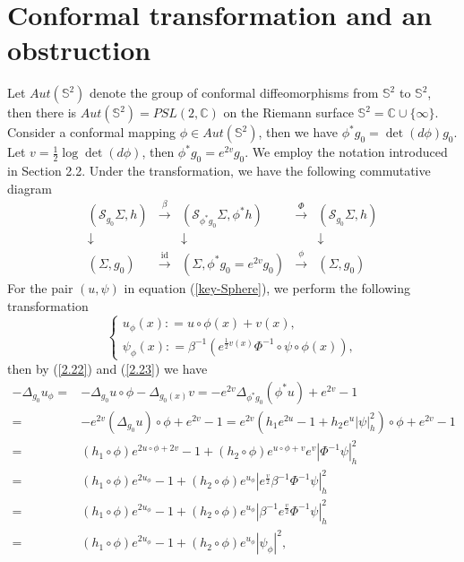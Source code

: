 \documentclass[a4paper, 12pt]{article}
\begin{document}
\section{Conformal transformation and an obstruction}
Let \(Aut(\mathbb{S}^2)\) denote the group of conformal diffeomorphisms from \( \mathbb{S}^2 \) to \( \mathbb{S}^2 \), then there is \( Aut(\mathbb{S}^2) = PSL(2,\mathbb{C}) \) on the Riemann surface $\mathbb{S}^2=\mathbb{C}\cup \{\infty\}$.  Consider a conformal mapping \( \phi \in Aut(\mathbb{S}^2) \), then we have \( {\phi ^*}{g_0} = \det (d\phi) {g_0} \). Let $v=\frac{1}{2}\log \det \left(d \phi\right) $, then \( {\phi ^*}{g_0} = e^{2v} {g_0} \). We employ the notation introduced in Section 2.2. Under the transformation, we have the following commutative diagram
\[\begin{array}{*{20}{c}}
	{({\mathcal{S}_{g_0}}\Sigma ,h)}&{\xrightarrow{\beta }}&{({\mathcal{S}_{{\phi ^*}g_0}}\Sigma ,{\phi ^*}h)}&{\xrightarrow{\Phi }}&{({\mathcal{S}_{g_0}}\Sigma ,h)} \\
	\downarrow &{}& \downarrow &{}& \downarrow  \\
	{(\Sigma ,{g_0})}&{\xrightarrow{{{\text{id}}}}}&{(\Sigma ,{\phi ^*}{g_0} = {e^{2v}}{g_0})}&{\xrightarrow{\phi }}&{(\Sigma ,{g_0})}
\end{array}\]
For the pair \((u, \psi)\) in equation (\ref{key-Sphere}), we perform the following transformation
\begin{equation}\label{trans}
	\begin{cases}
		{{u_\phi }\left( x \right): = u \circ \phi \left( x \right) + v\left( x \right),} \\
		{{\psi _\phi }\left( x \right): = {\beta ^{ - 1}}\left( {{e^{\frac{1}{2}v\left( x \right)}}{\Phi ^{ - 1}} \circ \psi  \circ \phi \left( x \right)} \right),}
	\end{cases}
\end{equation}
then by (\ref{2.22}) and (\ref{2.23}) we have
\[\begin{aligned}
	- {\Delta _{{g_0}}}{u_\phi } =&  - {\Delta _{{g_0}}}u \circ \phi  - {\Delta _{{g_0}\left( x \right)}}v
	=  - {e^{2v}}{\Delta _{{\phi ^*}{g_0}}}\left( {{\phi ^*}u} \right) + {e^{2v}} - 1  \\
	= &- {e^{2v}}\left( {{\Delta _{{g_0}}}u} \right) \circ \phi  + {e^{2v}} - 1
	= {e^{2v}}\left( {h_1{e^{2u}} - 1 + h_2{e^u}\left| \psi  \right|_h^2} \right) \circ \phi  + {e^{2v}} - 1  \\
	=& \left( {h_1 \circ \phi } \right){e^{2u \circ \phi  + 2v}} - 1 +\left(h_2\circ \phi\right) {e^{u \circ \phi  + v}}{e^v}\left| {{\Phi ^{ - 1}}\psi } \right|_h^2 \\
	=& \left( {h_1 \circ \phi } \right){e^{2{u_\phi }}} - 1 + \left(h_2\circ \phi\right){e^{{u_\phi }}}\left| {{e^{\frac{v}{2}}}{\beta ^{ - 1}}{\Phi ^{ - 1}}\psi } \right|_h^2  \\
	= &\left( {h_1 \circ \phi } \right){e^{2{u_\phi }}} - 1 +\left(h_2\circ \phi\right) {e^{{u_\phi }}}\left| {{\beta ^{ - 1}}{e^{\frac{v}{2}}}{\Phi ^{ - 1}}\psi } \right|_h^2  \\
	= &\left( {h_1 \circ \phi } \right){e^{2{u_\phi }}} - 1 +\left(h_2\circ \phi\right) {e^{{u_\phi }}}{\left| {{\psi _\phi }} \right|^2} ,
\end{aligned} \]
\end{document}
